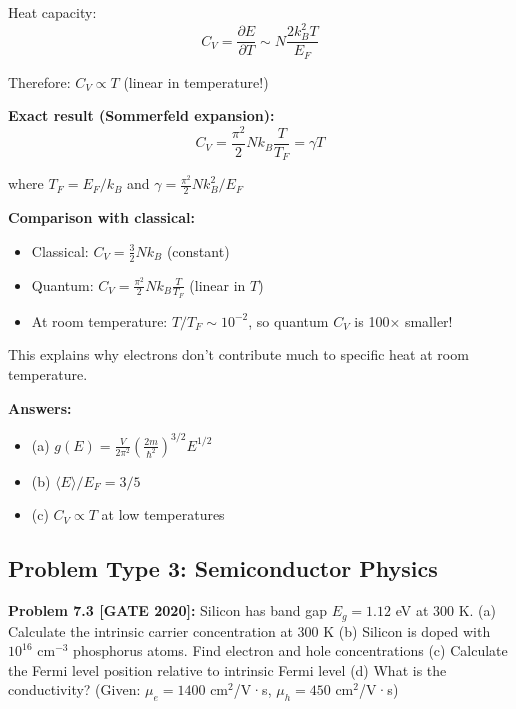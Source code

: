 \documentclass[12pt,a4paper]{article}
\begin{document}
\begin{solution}
Heat capacity:
$$C_V = \frac{\partial E}{\partial T} \sim N \frac{2k_B^2 T}{E_F}$$

Therefore: $C_V \propto T$ (linear in temperature!)

\textbf{Exact result (Sommerfeld expansion):}
$$C_V = \frac{\pi^2}{2}Nk_B\frac{T}{T_F} = \gamma T$$

where $T_F = E_F/k_B$ and $\gamma = \frac{\pi^2}{2}Nk_B^2/E_F$

\textbf{Comparison with classical:}
\begin{itemize}
    \item Classical: $C_V = \frac{3}{2}Nk_B$ (constant)
    \item Quantum: $C_V = \frac{\pi^2}{2}Nk_B\frac{T}{T_F}$ (linear in $T$)
    \item At room temperature: $T/T_F \sim 10^{-2}$, so quantum $C_V$ is 100× smaller!
\end{itemize}

This explains why electrons don't contribute much to specific heat at room temperature.

\textbf{Answers:}
\begin{itemize}
    \item (a) $g(E) = \frac{V}{2\pi^2}\left(\frac{2m}{\hbar^2}\right)^{3/2} E^{1/2}$
    \item (b) $\langle E \rangle / E_F = 3/5$
    \item (c) $C_V \propto T$ at low temperatures
\end{itemize}
\end{solution}

\subsection{Problem Type 3: Semiconductor Physics}

\textbf{Problem 7.3 [GATE 2020]:} Silicon has band gap $E_g = 1.12$ eV at 300 K.
(a) Calculate the intrinsic carrier concentration at 300 K
(b) Silicon is doped with $10^{16}$ cm$^{-3}$ phosphorus atoms. Find electron and hole concentrations
(c) Calculate the Fermi level position relative to intrinsic Fermi level
(d) What is the conductivity? (Given: $\mu_e = 1400$ cm$^2$/V·s, $\mu_h = 450$ cm$^2$/V·s)
\end{document}

